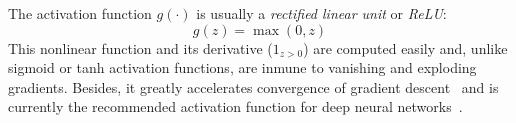 The activation function $g(\cdot)$ is usually a \emph{rectified linear unit} or \emph{ReLU}:
\begin{equation}
	g(z) = \max(0,z)
\end{equation}
This nonlinear function and its derivative ($1_{z>0}$) are computed easily and, unlike sigmoid or tanh activation functions, are inmune to vanishing and exploding gradients. Besides, it greatly accelerates convergence of gradient descent~\cite{Krizhevsky2012} and is currently the recommended activation function for deep neural networks~\cite{Karpathy2016}.

